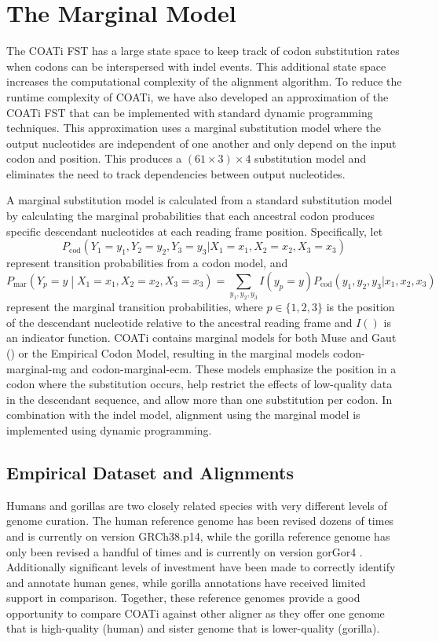 \documentclass[12pt,letterpaper]{article}
\begin{document}
\section*{The Marginal Model}

The COATi FST has a large state space to keep track of codon substitution rates when codons can be interspersed with indel events. This additional state space increases the computational complexity of the alignment algorithm. To reduce the runtime complexity of COATi, we have also developed an approximation of the COATi FST that can be implemented with standard dynamic programming techniques. This approximation uses a marginal substitution model where the output nucleotides are independent of one another and only depend on the input codon and position. This produces a $\left(61 \times 3 \right) \times 4$ substitution model and eliminates the need to track dependencies between output nucleotides.

A marginal substitution model is calculated from a standard substitution model by calculating the marginal probabilities that each ancestral codon produces specific descendant nucleotides at each reading frame position. Specifically, let
%
\[
P_\text{cod}\left( Y_1 = y_1, Y_2 = y_2, Y_3 = y_3 |
                   X_1 = x_1, X_2 = x_2, X_3 = x_3 \right)
\]
%
represent transition probabilities from a codon model, and
%
\[
P_\text{mar}\left(Y_p = y \middle| X_1 = x_1, X_2 = x_2, X_3 = x_3 \right)
=
\sum_{y_1, y_2, y_3} I(y_p = y)
P_\text{cod}\left( y_1, y_2, y_3 |
                   x_1, x_2, x_3 \right)
\]
%
represent the marginal transition probabilities, where $p \in \{1, 2, 3\}$ is the position of the descendant nucleotide relative to the ancestral reading frame and $I()$ is an indicator function. COATi contains marginal models for both Muse and Gaut (\citeyear{muse_gaut_1994}) or the Empirical Codon Model, resulting in the marginal models codon-marginal-mg and codon-marginal-ecm. These models emphasize the position in a codon where the substitution occurs, help restrict the effects of low-quality data in the descendant sequence, and allow more than one substitution per codon. In combination with the indel model, alignment using the marginal model is implemented using dynamic programming.

\subsection*{Empirical Dataset and Alignments}

Humans and gorillas are two closely related species with very different levels of genome curation. The human reference genome has been revised dozens of times and is currently on version GRCh38.p14, while the gorilla reference genome has only been revised a handful of times and is currently on version gorGor4 \citep[cf.\ ENSEMBL database v110;][]{ensembl_hubbard_2002}. Additionally significant levels of investment have been made to correctly identify and annotate human genes, while gorilla annotations have received limited support in comparison. Together, these reference genomes provide a good opportunity to compare COATi against other aligner as they offer one genome that is high-quality (human) and sister genome that is lower-quality (gorilla).
\end{document}
